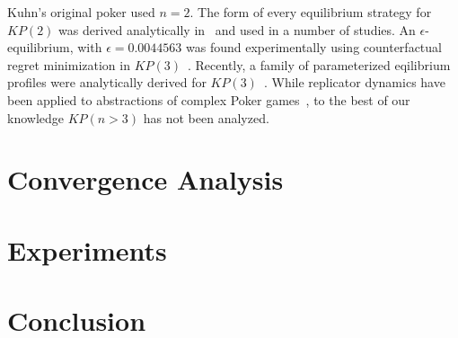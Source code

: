 \documentclass{aamas2014}
\begin{document}
Kuhn's original poker used $n = 2$. The form of every equilibrium strategy for $KP(2)$ was derived analytically 
in~\cite{hoehn05} and used in a number of studies. An $\epsilon$-equilibrium, with $\epsilon = 0.0044563$ was 
found experimentally using counterfactual regret minimization in $KP(3)$~\cite{AbouRisk10}. 
Recently, a family of parameterized eqilibrium profiles were analytically derived for $KP(3)$~\cite{Szafron13Kuhn}.
While replicator dynamics have been applied to abstractions of complex Poker games~\cite{ponsen09b},
to the best of our knowledge $KP(n > 3)$ has not been analyzed. 


\section{Convergence Analysis}

\section{Experiments}

\section{Conclusion}



%

%
%
\end{document}
